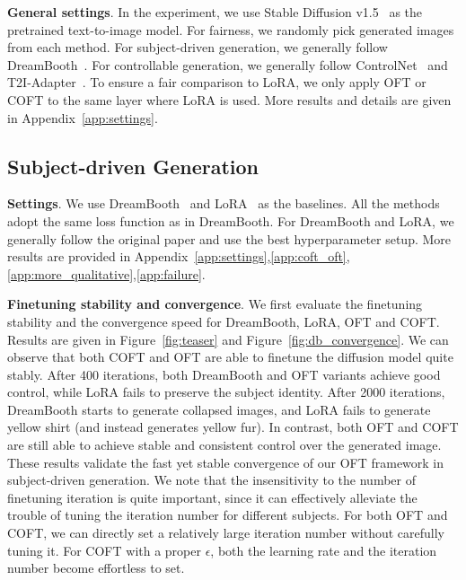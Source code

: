 \textbf{General settings}. In the experiment, we use Stable Diffusion v1.5~\cite{rombach2022high} as the pretrained text-to-image model. 
For fairness, we randomly pick generated images from each method. For subject-driven generation, we generally follow DreamBooth~\cite{ruiz2023dreambooth}. For controllable generation, we generally follow  ControlNet~\cite{zhang2023adding} and T2I-Adapter~\cite{mou2023t2i}. To ensure a fair comparison to LoRA, we only apply OFT or COFT to the same layer where LoRA is used. More results and details are given in Appendix~\ref{app:settings}.

\vspace{-1.4mm}
\subsection{Subject-driven Generation}
\vspace{-1.05mm}



\textbf{Settings}. We use DreamBooth~\cite{ruiz2023dreambooth} and LoRA~\cite{hulora2022} as the baselines. All the methods adopt the same loss function as in DreamBooth. For DreamBooth and LoRA, we generally follow the original paper and use the best hyperparameter setup. More results are provided in Appendix~\ref{app:settings},\ref{app:coft_oft},\ref{app:more_qualitative},\ref{app:failure}.

\textbf{Finetuning stability and convergence}. We first evaluate the finetuning stability and the convergence speed for DreamBooth, LoRA, OFT and COFT. Results are given in Figure~\ref{fig:teaser} and Figure~\ref{fig:db_convergence}. We can observe that both COFT and OFT are able to finetune the diffusion model quite stably. After 400 iterations, both DreamBooth and OFT variants achieve good control, while LoRA fails to preserve the subject identity. After 2000 iterations, DreamBooth starts to generate collapsed images, and LoRA fails to generate yellow shirt (and instead generates yellow fur). In contrast, both OFT and COFT are still able to achieve stable and consistent control over the generated image. These results validate the fast yet stable convergence of our OFT framework in subject-driven generation. We note that the insensitivity to the number of finetuning iteration is quite important, since it can effectively alleviate the trouble of tuning the iteration number for different subjects. For both OFT and COFT, we can directly set a relatively large iteration number without carefully tuning it. For COFT with a proper $\epsilon$, both the learning rate and the iteration number become effortless to set.

